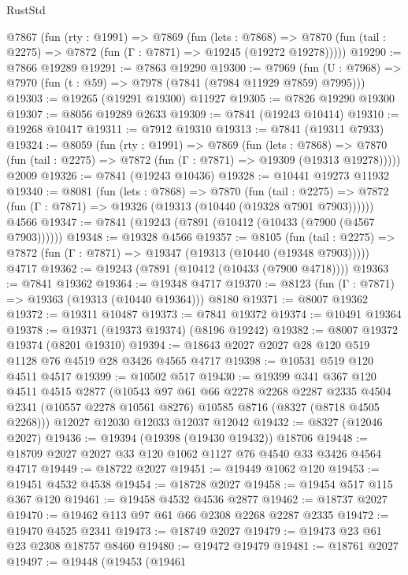 \begin{lexlean}{RustStd}
\begin{coremodule}
{\begin{coremodule}
{{{{{{{{{{{{{{{{{{{{{{{{{{{{{{{{{{{{{{{{{{{{{{{{{{{{{{  @7867
    (fun (rty : @1991) =>
    @7869
      (fun (lets : @7868) =>
      @7870 (fun (tail : @2275) => @7872 (fun (Γ : @7871) => @19245 (@19272 @19278)))))
@19290 := @7866 @19289
@19291 := @7863 @19290
@19300 := @7969
    (fun (U : @7968) => @7970 (fun (t : @59) => @7978 (@7841 (@7984 @11929 @7859) @7995)))
@19303 := @19265 (@19291 @19300) @11927
@19305 := @7826 @19290 @19300
@19307 := @8056 @19289 @2633
@19309 := @7841 (@19243 @10414)
@19310 := @19268 @10417
@19311 := @7912 @19310
@19313 := @7841 (@19311 @7933)
@19324 := @8059
    (fun (rty : @1991) =>
    @7869
      (fun (lets : @7868) =>
      @7870 (fun (tail : @2275) => @7872 (fun (Γ : @7871) => @19309 (@19313 @19278)))))
    @2009
@19326 := @7841 (@19243 @10436)
@19328 := @10441 @19273 @11932
@19340 := @8081
    (fun (lets : @7868) =>
    @7870
      (fun (tail : @2275) =>
      @7872 (fun (Γ : @7871) => @19326 (@19313 (@10440 (@19328 @7901 @7903))))))
    @4566
@19347 := @7841 (@19243 (@7891 (@10412 (@10433 (@7900 (@4567 @7903))))))
@19348 := @19328 @4566
@19357 := @8105
    (fun (tail : @2275) => @7872 (fun (Γ : @7871) => @19347 (@19313 (@10440 (@19348 @7903)))))
    @4717
@19362 := @19243 (@7891 (@10412 (@10433 (@7900 @4718))))
@19363 := @7841 @19362
@19364 := @19348 @4717
@19370 := @8123 (fun (Γ : @7871) => @19363 (@19313 (@10440 @19364))) @8180
@19371 := @8007 @19362
@19372 := @19311 @10487
@19373 := @7841 @19372
@19374 := @10491 @19364
@19378 := @19371 (@19373 @19374) (@8196 @19242)
@19382 := @8007 @19372 @19374 (@8201 @19310)
@19394 := @18643 @2027 @2027 @28 @120 @519 @1128 @76 @4519 @28 @3426 @4565 @4717
@19398 := @10531 @519 @120 @4511 @4517
@19399 := @10502 @517
@19430 := @19399
    @341
    @367
    @120
    @4511
    @4515
    @2877
    (@10543
      @97
      @61
      @66
      @2278
      @2268
      @2287
      @2335
      @4504
      @2341
      (@10557 @2278 @10561 @8276)
      @10585
      @8716
      (@8327 (@8718 @4505 @2268)))
    @12027
    @12030
    @12033
    @12037
    @12042
@19432 := @8327 (@12046 @2027)
@19436 := @19394 (@19398 (@19430 @19432)) @18706
@19448 := @18709 @2027 @2027 @33 @120 @1062 @1127 @76 @4540 @33 @3426 @4564 @4717
@19449 := @18722 @2027
@19451 := @19449 @1062 @120
@19453 := @19451 @4532 @4538
@19454 := @18728 @2027
@19458 := @19454 @517 @115 @367 @120
@19461 := @19458 @4532 @4536 @2877
@19462 := @18737 @2027
@19470 := @19462 @113 @97 @61 @66 @2308 @2268 @2287 @2335
@19472 := @19470 @4525 @2341
@19473 := @18749 @2027
@19479 := @19473 @23 @61 @23 @2308 @18757 @8460
@19480 := @19472 @19479
@19481 := @18761 @2027
@19497 := @19448
    (@19453
      (@19461
}}}}}}}}}}}}}}}}}}}}}}}}}}}}}}}}}}}}}}}}}}}}}}}}}}}}}}
\end{coremodule}}
\end{coremodule}
\end{lexlean}
